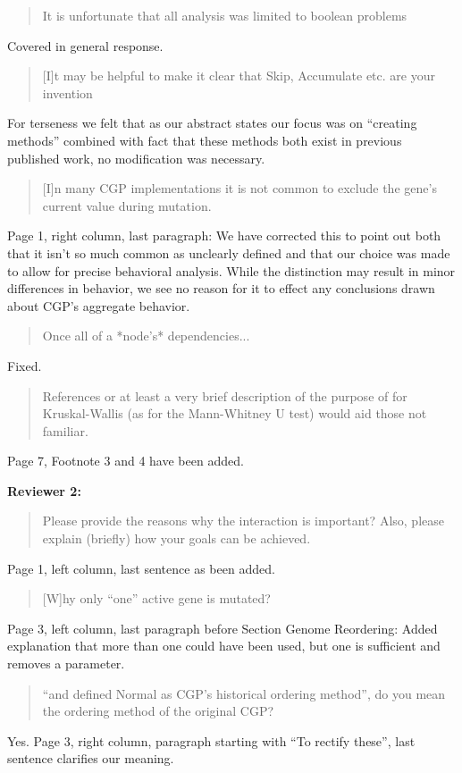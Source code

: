 \documentclass{letter}
\begin{document}
\begin{letter}{}
\begin{quote}It is unfortunate that all analysis was limited to boolean problems\end{quote}
Covered in general response.

\begin{quote}[I]t may be helpful to make it clear that Skip, Accumulate etc. are your invention\end{quote}
For terseness we felt that as our abstract states our focus was on ``creating methods''
combined with fact that these methods both exist in previous published work, no modification
was necessary.

\begin{quote}[I]n many CGP implementations it is not common to exclude the gene's current value during mutation.\end{quote}
Page 1, right column, last paragraph: We have corrected this to point out both that it isn't
so much common as unclearly defined and that our choice was made to allow
for precise behavioral analysis.  While the distinction may result in minor differences in behavior,
we see no reason for it to effect any conclusions drawn about CGP's aggregate behavior.

\begin{quote}Once all of a *node's* dependencies...\end{quote}
Fixed.

\begin{quote}References or at least a very brief description of the purpose of for
Kruskal-Wallis (as for the Mann-Whitney U test) would aid those not familiar.\end{quote}
Page 7, Footnote 3 and 4 have been added.


\textbf{Reviewer 2:}

\begin{quote}Please provide the reasons why the interaction is important? Also, please explain (briefly) how your goals can be achieved.\end{quote}
Page 1, left column, last sentence as been added.

\begin{quote}[W]hy only ``one'' active gene is mutated?\end{quote}
Page 3, left column, last paragraph before Section Genome Reordering: Added explanation that more than
one could have been used, but one is sufficient and removes a parameter.

\begin{quote}``and defined Normal as CGP's historical ordering method'', do you mean the ordering method of the original CGP?\end{quote}
Yes.  Page 3, right column, paragraph starting with ``To rectify these'', last sentence clarifies our meaning.


\end{letter}
\end{document}
